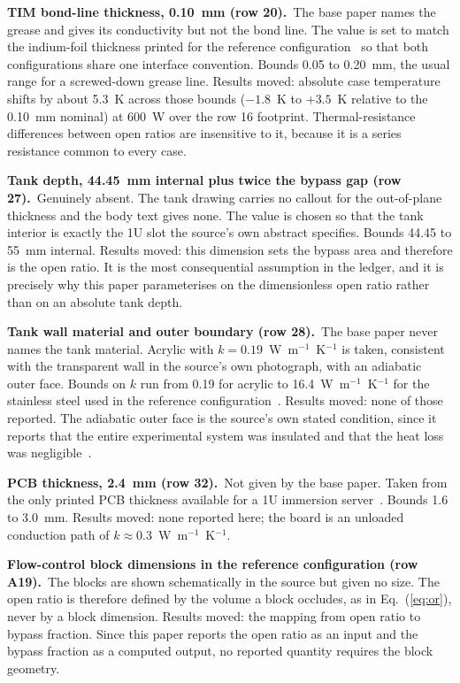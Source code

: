 \noindent\textbf{TIM bond-line thickness, 0.10~mm (row 20).}\ The base paper names the grease and gives its
conductivity but not the bond line. The value is set to match the indium-foil thickness printed for
the reference configuration~\cite{chun2026} so that both configurations share one interface
convention. Bounds 0.05 to 0.20~mm, the usual range for a screwed-down grease line. Results moved:
absolute case temperature shifts by about 5.3~K across those bounds ($-1.8$~K to $+3.5$~K relative to
the 0.10~mm nominal) at 600~W over the row 16 footprint. Thermal-resistance differences between open
ratios are insensitive to it, because it is a series resistance common to every case.

\noindent\textbf{Tank depth, 44.45~mm internal plus twice the bypass gap (row 27).}\ Genuinely absent. The tank
drawing carries no callout for the out-of-plane thickness and the body text gives none. The value
is chosen so that the tank interior is exactly the 1U slot the source's own abstract specifies.
Bounds 44.45 to 55~mm internal. Results moved: this dimension sets the bypass area and therefore
is the open ratio. It is the most consequential assumption in the ledger, and it is precisely why
this paper parameterises on the dimensionless open ratio rather than on an absolute tank depth.

\noindent\textbf{Tank wall material and outer boundary (row 28).}\ The base paper never names the tank material.
Acrylic with $k = 0.19$~W~m$^{-1}$~K$^{-1}$ is taken, consistent with the transparent wall in the
source's own photograph, with an adiabatic outer face. Bounds on $k$ run from 0.19 for acrylic to
16.4~W~m$^{-1}$~K$^{-1}$ for the stainless steel used in the reference
configuration~\cite{chun2026}. Results moved: none of those reported. The adiabatic outer face is
the source's own stated condition, since it reports that the entire experimental system was
insulated and that the heat loss was negligible~\cite{muneeshwaran2023}.

\noindent\textbf{PCB thickness, 2.4~mm (row 32).}\ Not given by the base paper. Taken from the only printed
PCB thickness available for a 1U immersion server~\cite{khoshvaghtaliabadi2026oblique}. Bounds 1.6
to 3.0~mm. Results moved: none reported here; the board is an unloaded conduction path of
$k \approx 0.3$~W~m$^{-1}$~K$^{-1}$.

\noindent\textbf{Flow-control block dimensions in the reference configuration (row A19).}\ The blocks are shown
schematically in the source but given no size. The open ratio is therefore defined by the volume a
block occludes, as in Eq.~(\ref{eq:or}), never by a block dimension. Results moved: the mapping
from open ratio to bypass fraction. Since this paper reports the open ratio as an input and the
bypass fraction as a computed output, no reported quantity requires the block geometry.

